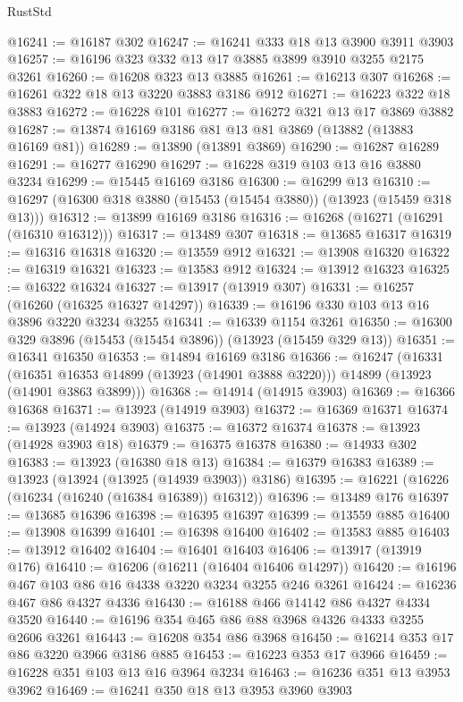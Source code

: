 \begin{lexlean}{RustStd}
\begin{coremodule}
@16241 := @16187 @302
@16247 := @16241 @333 @18 @13 @3900 @3911 @3903
@16257 := @16196 @323 @332 @13 @17 @3885 @3899 @3910 @3255 @2175 @3261
@16260 := @16208 @323 @13 @3885
@16261 := @16213 @307
@16268 := @16261 @322 @18 @13 @3220 @3883 @3186 @912
@16271 := @16223 @322 @18 @3883
@16272 := @16228 @101
@16277 := @16272 @321 @13 @17 @3869 @3882
@16287 := @13874 @16169 @3186 @81 @13 @81 @3869 (@13882 (@13883 @16169 @81))
@16289 := @13890 (@13891 @3869)
@16290 := @16287 @16289
@16291 := @16277 @16290
@16297 := @16228 @319 @103 @13 @16 @3880 @3234
@16299 := @15445 @16169 @3186
@16300 := @16299 @13
@16310 := @16297 (@16300 @318 @3880 (@15453 (@15454 @3880)) (@13923 (@15459 @318 @13)))
@16312 := @13899 @16169 @3186
@16316 := @16268 (@16271 (@16291 (@16310 @16312)))
@16317 := @13489 @307
@16318 := @13685 @16317
@16319 := @16316 @16318
@16320 := @13559 @912
@16321 := @13908 @16320
@16322 := @16319 @16321
@16323 := @13583 @912
@16324 := @13912 @16323
@16325 := @16322 @16324
@16327 := @13917 (@13919 @307)
@16331 := @16257 (@16260 (@16325 @16327 @14297))
@16339 := @16196 @330 @103 @13 @16 @3896 @3220 @3234 @3255
@16341 := @16339 @1154 @3261
@16350 := @16300 @329 @3896 (@15453 (@15454 @3896)) (@13923 (@15459 @329 @13))
@16351 := @16341 @16350
@16353 := @14894 @16169 @3186
@16366 := @16247
    (@16331
      (@16351 @16353 @14899 (@13923 (@14901 @3888 @3220)))
      @14899
      (@13923 (@14901 @3863 @3899)))
@16368 := @14914 (@14915 @3903)
@16369 := @16366 @16368
@16371 := @13923 (@14919 @3903)
@16372 := @16369 @16371
@16374 := @13923 (@14924 @3903)
@16375 := @16372 @16374
@16378 := @13923 (@14928 @3903 @18)
@16379 := @16375 @16378
@16380 := @14933 @302
@16383 := @13923 (@16380 @18 @13)
@16384 := @16379 @16383
@16389 := @13923 (@13924 (@13925 (@14939 @3903)) @3186)
@16395 := @16221 (@16226 (@16234 (@16240 (@16384 @16389)) @16312))
@16396 := @13489 @176
@16397 := @13685 @16396
@16398 := @16395 @16397
@16399 := @13559 @885
@16400 := @13908 @16399
@16401 := @16398 @16400
@16402 := @13583 @885
@16403 := @13912 @16402
@16404 := @16401 @16403
@16406 := @13917 (@13919 @176)
@16410 := @16206 (@16211 (@16404 @16406 @14297))
@16420 := @16196 @467 @103 @86 @16 @4338 @3220 @3234 @3255 @246 @3261
@16424 := @16236 @467 @86 @4327 @4336
@16430 := @16188 @466 @14142 @86 @4327 @4334 @3520
@16440 := @16196 @354 @465 @86 @88 @3968 @4326 @4333 @3255 @2606 @3261
@16443 := @16208 @354 @86 @3968
@16450 := @16214 @353 @17 @86 @3220 @3966 @3186 @885
@16453 := @16223 @353 @17 @3966
@16459 := @16228 @351 @103 @13 @16 @3964 @3234
@16463 := @16236 @351 @13 @3953 @3962
@16469 := @16241 @350 @18 @13 @3953 @3960 @3903

\end{coremodule}
\end{lexlean}
